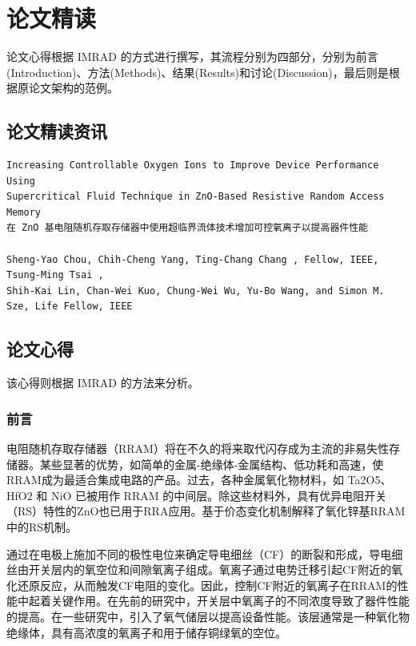 \chapter{论文精读}
\label{chap:1}

论文心得根据 IMRAD 的方式进行撰写，其流程分别为四部分，分别为前言(Introduction)、方法(Methods)、结果(Results)和讨论(Discussion)，最后则是根据原论文架构的范例。

\section{论文精读资讯}

\begin{Verbatim}
Increasing Controllable Oxygen Ions to Improve Device Performance Using 
Supercritical Fluid Technique in ZnO-Based Resistive Random Access Memory
在 ZnO 基电阻随机存取存储器中使用超临界流体技术增加可控氧离子以提高器件性能

Sheng-Yao Chou, Chih-Cheng Yang, Ting-Chang Chang , Fellow, IEEE, Tsung-Ming Tsai , 
Shih-Kai Lin, Chan-Wei Kuo, Chung-Wei Wu, Yu-Bo Wang, and Simon M. Sze, Life Fellow, IEEE
\end{Verbatim}


\section{论文心得}

该心得则根据 IMRAD 的方法来分析。

\subsection{前言}

电阻随机存取存储器（RRAM）将在不久的将来取代闪存成为主流的非易失性存储器。某些显著的优势，如简单的金属-绝缘体-金属结构、低功耗和高速，使RRAM成为最适合集成电路的产品。过去，各种金属氧化物材料，如 Ta2O5、HfO2 和 NiO 已被用作 RRAM 的中间层。除这些材料外，具有优异电阻开关（RS）特性的ZnO也已用于RRA应用。基于价态变化机制解释了氧化锌基RRAM中的RS机制。

通过在电极上施加不同的极性电位来确定导电细丝（CF）的断裂和形成，导电细丝由开关层内的氧空位和间隙氧离子组成。氧离子通过电势迁移引起CF附近的氧化还原反应，从而触发CF电阻的变化。因此，控制CF附近的氧离子在RRAM的性能中起着关键作用。在先前的研究中，开关层中氧离子的不同浓度导致了器件性能的提高。在一些研究中，引入了氧气储层以提高设备性能。该层通常是一种氧化物绝缘体，具有高浓度的氧离子和用于储存铜绿氧的空位。

